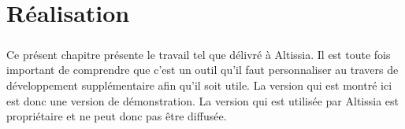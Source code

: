 \chapter{Réalisation}
\label{ch:implementation}

\paragraph{}
Ce présent chapitre présente le travail tel que délivré à Altissia.
Il est toute fois important de comprendre que c'est un outil qu'il faut personnaliser au travers de développement supplémentaire afin qu'il soit utile.
La version qui est montré ici est donc une version de démonstration.
La version qui est utilisée par Altissia est propriétaire et ne peut donc pas être diffusée.



